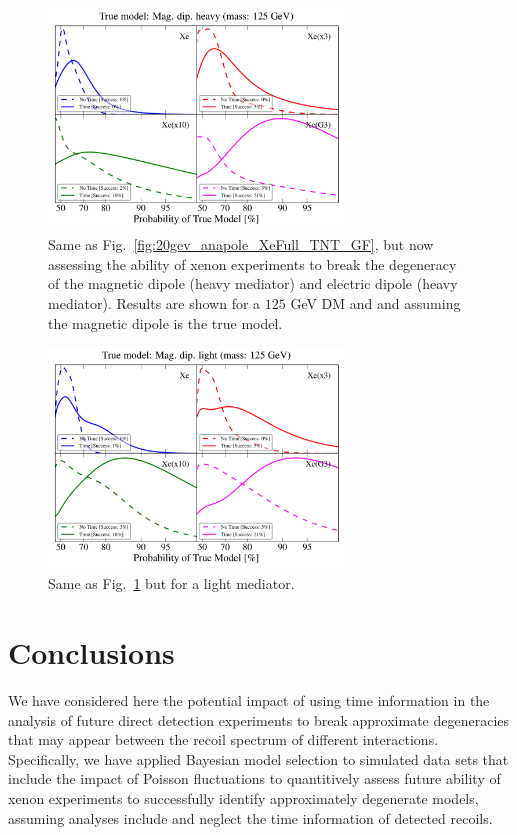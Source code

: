 \documentclass[11pt]{article}
\newcommand{\Fig}[1]{Fig.~\ref{#1}} \newcommand{\Figs}[2]{Figs.~\ref{#1} and \ref{#2}}
\begin{document}
\begin{figure}
\centering
\includegraphics[width=0.7\textwidth]{plots/PDF_125GeV_Magdipheavy_50sims_Xe_Xe3x_Xe10x_XeG3_GF_TNT.pdf}
\caption{\label{fig:125gev_Mag.dip.heavy_XeFull_TNT_GF}
Same as Fig.~\ref{fig:20gev_anapole_XeFull_TNT_GF}, but now assessing the ability of xenon experiments to break the degeneracy of the magnetic dipole (heavy mediator) and electric dipole (heavy mediator). Results are shown for a $125$ GeV DM and and assuming the magnetic dipole is the true model.}
\end{figure}


\begin{figure}
\centering
\includegraphics[width=0.7\textwidth]{plots/PDF_125GeV_Magdiplight_50sims_Xe_Xe3x_Xe10x_XeG3_GF_TNT.pdf}
\caption{\label{fig:125gev_Mag.dip.light_XeFull_TNT_GF}
Same as \Fig{fig:125gev_Mag.dip.heavy_XeFull_TNT_GF} but for a light mediator. }
\end{figure}


\section{Conclusions}
We have considered here the potential impact of using time information in the analysis of future direct detection experiments to break approximate degeneracies that may appear between the recoil spectrum of different interactions. Specifically, we have applied Bayesian model selection to simulated data sets that include the impact of Poisson fluctuations to quantitively assess future ability of xenon experiments to successfully identify approximately degenerate models, assuming analyses include and neglect the time information of detected recoils.
\end{document}
